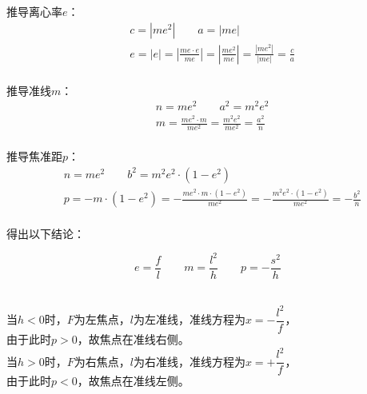 \documentclass[UTF8]{ctexart}
\begin{document}
    推导离心率$e$：
    \begin{align}
        &c=\left|me^2\right|\qquad a=|me|\\[3mm]
        &e=|e|=\left|\frac{me\cdot e}{me}\right|=\left|\frac{me^2}{me}\right|=\frac{\left|me^2\right|}{|me|}=\frac{c}{a}
    \end{align}\\
    推导准线$m$：
    \begin{align}
        &n=me^2\qquad a^2=m^2e^2\\[3mm]
        &m
        =\frac{me^2\cdot m}{me^2}
        =\frac{m^2e^2}{me^2}
        =\frac{a^2}{n}
    \end{align}\\
    推导焦准距$p$：
    \begin{align}
        &n=me^2\qquad b^2=m^2e^2\cdot\left(1-e^2\right)\\[3mm]
        &p
        =-m\cdot\left(1-e^2\right)
        =-\frac{me^2\cdot m\cdot\left(1-e^2\right)}{me^2}
        =-\frac{m^2e^2\cdot\left(1-e^2\right)}{me^2}
        =-\frac{b^2}{n}
    \end{align}\\
    得出以下结论：
    \begin{large}
        \begin{equation*}
            e=\frac{f}{l}\qquad m=\frac{l^2}{h}\qquad p=-\frac{s^2}{h}
        \end{equation*}
    \end{large}\\[1mm]
    当$h<0$时，$F$为左焦点，$l$为左准线，准线方程为$x=-\dfrac{l^2}{f}$，\\[1mm]
    由于此时$p>0$，故焦点在准线右侧。\\[3mm]
    当$h>0$时，$F$为右焦点，$l$为右准线，准线方程为$x=+\dfrac{l^2}{f}$，\\[1mm]
    由于此时$p<0$，故焦点在准线左侧。\vspace{6pt}
\end{document}
